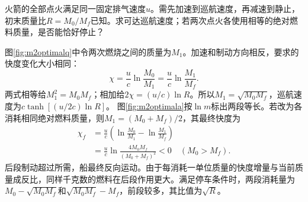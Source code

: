 \begin{example}\label{ex:m2fueloptimal}
火箭的全部点火满足同一固定排气速度$u$。需先加速到巡航速度，再减速到静止，初末质量比$R=M_0/M_f$已知。求可达巡航速度；若两次点火各使用相等的绝对燃料质量，是否能恰好停止？
\end{example}
\begin{solution}
图\ref{fig:m2optimalq}中令两次燃烧之间的质量为$M_1$。加速和制动方向相反，要求的快度变化大小相同：
\[
 \chi=\frac uc\ln\frac{M_0}{M_1}
 =\frac uc\ln\frac{M_1}{M_f}.
\]
两式相等给$M_1^2=M_0M_f$；相加给$2\chi=(u/c)\ln R$。所以$M_1=\sqrt{M_0M_f}$，巡航速度为$c\tanh[(u/2c)\ln R]$。
图\ref{fig:m2optimala}按$\ln m$标出两段等长。若改为各消耗相同绝对燃料质量，则$M_1=(M_0+M_f)/2$，其最终快度为
\begin{align*}
 \chi_f&=\frac uc\left(\ln\frac{M_0}{M_1}-\ln\frac{M_1}{M_f}\right)\\
 &=\frac uc\ln\frac{4M_0M_f}{(M_0+M_f)^2}<0
 \quad(M_0>M_f).
\end{align*}
后段制动超过所需，船最终反向运动。由于每消耗一单位质量的快度增量与当前质量成反比，同样千克数的燃料在后段作用更大。满足停车条件时，两段消耗量为$M_0-\sqrt{M_0M_f}$和$\sqrt{M_0M_f}-M_f$，前段较多，其比值为$\sqrt R$。
\end{solution}

